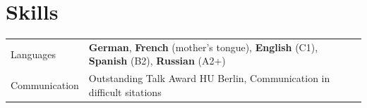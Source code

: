 \documentclass[a4paper,12pt]{article}
\begin{document}
\section{Skills}
\begin{tabularx}{\linewidth}{@{}l X@{}}
Languages &  \normalsize{\textbf{German}, \textbf{French} (mother's tongue), \textbf{English} (C1), \textbf{Spanish} (B2),} \textbf{Russian} (A2+)\\
Communication &  \normalsize{Outstanding Talk Award HU Berlin, Communication in difficult sitations }\\  
\end{tabularx}

\vfill
{}
\end{document}
